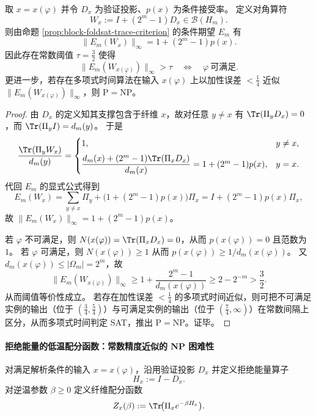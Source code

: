 \begin{theorem}[二值指数权重把指数精度困难提升为常数精度困难]\label{thm:block-foldsat-constant-precision-hardness}
取 \(x=x(\varphi)\) 并令 \(D_x\) 为验证投影、\(p(x)\) 为条件接受率。
定义对角算符
\[
W_x:=I+(2^m-1)D_x\in\mathcal B(H_m).
\]
则由命题 \ref{prop:block-foldsat-trace-criterion} 的条件期望 \(E_m\) 有
\[
\|E_m(W_x)\|_{\infty}=1+(2^m-1)p(x).
\]
因此存在常数阈值 \(\tau=\tfrac32\) 使得
\[
\|E_m(W_{x(\varphi)})\|_{\infty}>\tau
\quad\Longleftrightarrow\quad
\varphi\ \text{可满足}.
\]
更进一步，若存在多项式时间算法在输入 \(x(\varphi)\) 上以加性误差 \(<\tfrac14\) 近似 \(\|E_m(W_{x(\varphi)})\|_{\infty}\)，则 \(\mathrm{P}=\mathrm{NP}\)。
\end{theorem}

\begin{proof}
由 \(D_x\) 的定义知其支撑包含于纤维 \(x\)，故对任意 \(y\neq x\) 有 \(\Tr(\Pi_yD_x)=0\)，而 \(\Tr(\Pi_yI)=d_m(y)\)。
于是
\[
\frac{\Tr(\Pi_yW_x)}{d_m(y)}=
\begin{cases}
1,& y\neq x,\\[2mm]
\dfrac{d_m(x)+(2^m-1)\Tr(\Pi_xD_x)}{d_m(x)}=1+(2^m-1)p(x),& y=x.
\end{cases}
\]
代回 \(E_m\) 的显式公式得到
\[
E_m(W_x)=\sum_{y\neq x}\Pi_y+\bigl(1+(2^m-1)p(x)\bigr)\Pi_x
=I+(2^m-1)p(x)\Pi_x,
\]
故 \(\|E_m(W_x)\|_\infty=1+(2^m-1)p(x)\)。
\par
若 \(\varphi\) 不可满足，则 \(N(x(\varphi))=\Tr(\Pi_xD_x)=0\)，从而 \(p(x(\varphi))=0\) 且范数为 \(1\)。
若 \(\varphi\) 可满足，则 \(N(x(\varphi))\ge 1\) 从而 \(p(x(\varphi))\ge 1/d_m(x(\varphi))\)。
又 \(d_m(x(\varphi))\le |\Omega_m|=2^m\)，故
\[
\|E_m(W_{x(\varphi)})\|_\infty
\ge 1+\frac{2^m-1}{d_m(x(\varphi))}
\ge 2-2^{-m}
>\frac32.
\]
从而阈值等价性成立。
若存在加性误差 \(<\tfrac14\) 的多项式时间近似，则可把不可满足实例的输出（位于 \((\tfrac34,\tfrac54)\)）与可满足实例的输出（位于 \((\tfrac74,\infty)\)）在常数间隔上区分，从而多项式时间判定 SAT，推出 \(\mathrm{P}=\mathrm{NP}\)。证毕。
\end{proof}

\paragraph{拒绝能量的低温配分函数：常数精度近似的 NP 困难性}
对满足解析条件的输入 \(x=x(\varphi)\)，沿用验证投影 \(D_x\) 并定义拒绝能量算子
\[
H_x:=I-D_x.
\]
对逆温参数 \(\beta\ge 0\) 定义纤维配分函数
\[
Z_x(\beta):=\Tr\!\bigl(\Pi_x e^{-\beta H_x}\bigr).
\]

